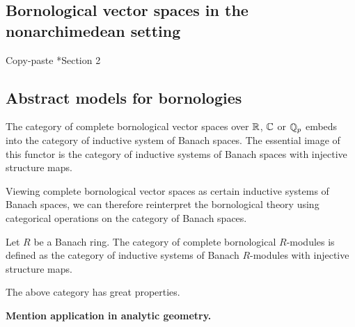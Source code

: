 \subsection{Bornological vector spaces in the nonarchimedean setting}


Copy-paste \cite{Cortinas-Cuntz-Meyer-Tamme:Nonarchimedean}*{Section 2}


\subsection{Abstract models for bornologies}


\begin{theorem}
The category of complete bornological vector spaces over \(\mathbb R\), \(\mathbb C\) or \(\mathbb Q_p\) embeds into the category of inductive system of Banach spaces. The essential image of this functor is the category of inductive systems of Banach spaces with injective structure maps.
\end{theorem}

Viewing complete bornological vector spaces as certain inductive systems of Banach spaces, we can therefore reinterpret the bornological theory using categorical operations on the category of Banach spaces. 

\begin{definition}
Let \(R\) be a Banach ring. The category of complete bornological \(R\)-modules is defined as the category of inductive systems of Banach \(R\)-modules with injective structure maps.
\end{definition}


\begin{theorem}
The above category has great properties.
\end{theorem}


\textbf{Mention application in analytic geometry.}
